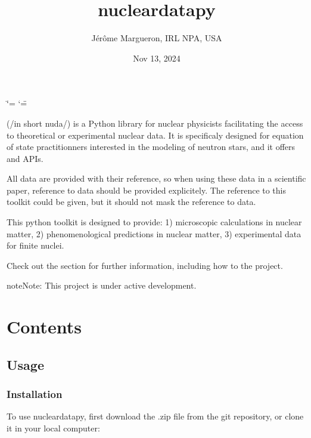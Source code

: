 \documentclass[letterpaper,10pt,english]{sphinxmanual}
\title{nucleardatapy}
\date{Nov 13, 2024}
\author{Jérôme Margueron, IRL NPA, USA}
\begin{document}
\ifdefined\shorthandoff
  \ifnum\catcode`\=\string=\active\shorthandoff{=}\fi
  \ifnum\catcode`\"=\active{}\fi
\fi

\pagestyle{empty}
\sphinxmaketitle
\pagestyle{plain}
\sphinxtableofcontents
\pagestyle{normal}
\label{\detokenize{index::doc}}


\sphinxAtStartPar
{} (/in short nuda/) is a Python library for nuclear physicists facilitating the access to theoretical or experimental nuclear data. It is specificaly designed for equation of state practitionners interested in the modeling of neutron stars, and it offers  and  APIs.

\sphinxAtStartPar
All data are provided with their reference, so when using these data in a scientific paper, reference to data should be provided explicitely. The reference to this toolkit could be given, but it should not mask the reference to data.

\sphinxAtStartPar
This python toolkit is designed to provide:
1) microscopic calculations in nuclear matter,
2) phenomenological predictions in nuclear matter,
3) experimental data for finite nuclei.

\sphinxAtStartPar
Check out the {\hyperref[\detokenize{source/usage::doc}]{}} section for further information, including how to
{\hyperref[\detokenize{source/usage:installation}]{}} the project.

\begin{sphinxadmonition}{note}{Note:}
\sphinxAtStartPar
This project is under active development.
\end{sphinxadmonition}


\chapter{Contents}
\label{\detokenize{index:contents}}
\sphinxstepscope


\section{Usage}
\label{\detokenize{source/usage:usage}}\label{\detokenize{source/usage::doc}}

\subsection{Installation}
\label{\detokenize{source/usage:installation}}\label{\detokenize{source/usage:id1}}
\sphinxAtStartPar
To use nucleardatapy, first download the .zip file from the git repository, or clone it in your local computer:
\end{document}
